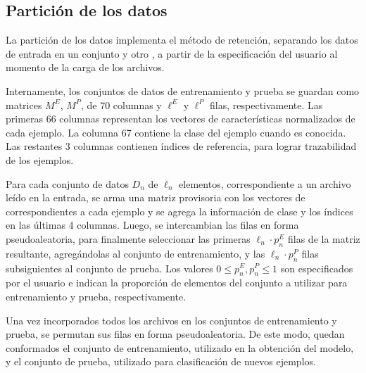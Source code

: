 %
%
%
\subsection{Partición de los datos}
%
La partición de los datos implementa el método de retención, separando
los datos de entrada en un conjunto  y otro
, a partir de la especificación del usuario al momento de
la carga de los archivos.

Internamente, los conjuntos de datos de entrenamiento y prueba se
guardan como matrices $M^E$, $M^P$, de 70 columnas y $\ell^E$ y
$\ell^P$ filas, respectivamente.
Las primeras 66 columnas representan los vectores de características
normalizados de cada ejemplo. La columna 67 contiene la clase del
ejemplo cuando es conocida. Las restantes 3 columnas contienen índices
de referencia, para lograr trazabilidad de los ejemplos.

Para cada conjunto de datos $D_n$ de $\ell_n$ elementos,
correspondiente a un archivo leído en la entrada, se arma una matriz
provisoria con los vectores de  correspondientes a cada
ejemplo y se agrega la información de clase y los índices en las
últimas 4 columnas. Luego, se intercambian las filas en forma
pseudoaleatoria, para finalmente seleccionar las primeras
$\ell_n\cdot{}p_n^E$ filas de la matriz resultante, agregándolas al
conjunto de entrenamiento, y las $\ell_n\cdot{}p_n^P$ filas
subsiguientes al conjunto de prueba. Los valores
$0\leq{}p_n^E,p_n^P\leq1$ son especificados por el usuario e indican
la proporción de elementos del conjunto a utilizar para entrenamiento
y prueba, respectivamente.

Una vez incorporados todos los archivos en los conjuntos de
entrenamiento y prueba, se permutan sus filas en forma
pseudoaleatoria. De este modo, quedan conformados el conjunto de
entrenamiento, utilizado en la obtención del modelo, y el conjunto de
prueba, utilizado para clasificación de nuevos ejemplos.



